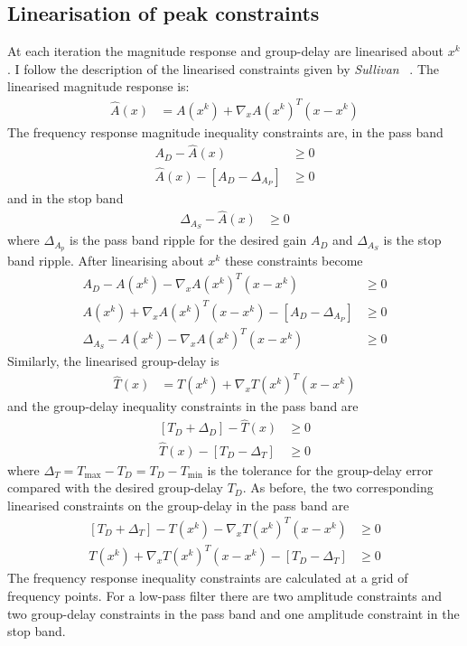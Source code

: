 \documentclass[a4paper,twoside,10pt,english]{report}
\begin{document}
\subsection{Linearisation of peak constraints}
At each iteration the magnitude response and group-delay are
linearised about $x^{k}$. I follow the description of the linearised 
constraints given by \emph{Sullivan} 
~\cite[p.2855]{SullivanAdams_PCLS_IIRDigitalFilters}. The linearised 
magnitude response is:
\begin{align*}
\hat{A}\left(x\right) &= A\left(x^{k}\right)+\nabla_{x}A\left(x^{k}\right)^{T}\left(x-x^{k}\right)
\end{align*}
The frequency response magnitude inequality constraints are, in the
pass band
\begin{align*}
A_{D}-\hat{A}\left(x\right) & \ge 0\\
\hat{A}\left(x\right)-\left[A_{D}-\Delta_{A_{P}}\right] & \ge 0
\end{align*}
and in the stop band
\begin{align*}
\Delta_{A_{S}}-\hat{A}\left(x\right) & \ge 0
\end{align*}
where $\Delta_{A_{p}}$ is the pass band ripple for the desired gain
$A_{D}$ and $\Delta_{A_{S}}$ is the stop band ripple. After linearising
about $x^{k}$ these constraints become
\begin{align*}
A_{D}-A\left(x^{k}\right)-\nabla_{x}A\left(x^{k}\right)^{T}\left(x-x^{k}\right) & \ge 0\\
A\left(x^{k}\right)+\nabla_{x}A\left(x^{k}\right)^{T}\left(x-x^{k}\right)-\left[A_{D}-\Delta_{A_{P}}\right] & \ge 0\\
\Delta_{A_{S}}-A\left(x^{k}\right)-\nabla_{x}A\left(x^{k}\right)^{T}\left(x-x^{k}\right) & \ge 0
\end{align*}
Similarly, the linearised group-delay is 
\begin{align*}
\hat{T}\left(x\right) &= T\left(x^{k}\right)+\nabla_{x}T\left(x^{k}\right)^{T}\left(x-x^{k}\right)
\end{align*}
and the group-delay inequality constraints in the pass band are
\begin{align*}
\left[T_{D}+\Delta_{D}\right]-\hat{T}\left(x\right) & \ge 0\\
\hat{T}\left(x\right)-\left[T_{D}-\Delta_{T}\right] & \ge 0
\end{align*}
where $\Delta_{T}=T_{\text{max}}-T_{D}=T_{D}-T_{\text{min}}$ is the tolerance for
the group-delay error compared with the desired group-delay $T_{D}$.
As before, the two corresponding linearised constraints on the 
group-delay in the pass band are
\begin{align*}
\left[T_{D}+\Delta_{T}\right]-T\left(x^{k}\right)-\nabla_{x}T\left(x^{k}\right)^{T}\left(x-x^{k}\right) & \ge 0\\
T\left(x^{k}\right)+\nabla_{x}T\left(x^{k}\right)^{T}\left(x-x^{k}\right)-\left[T_{D}-\Delta_{T}\right] & \ge 0
\end{align*}
The frequency response inequality constraints are calculated at a
grid of frequency points. For a low-pass filter there are two amplitude
constraints and two group-delay constraints in the pass band and 
one amplitude constraint in the stop band. 
\end{document}

